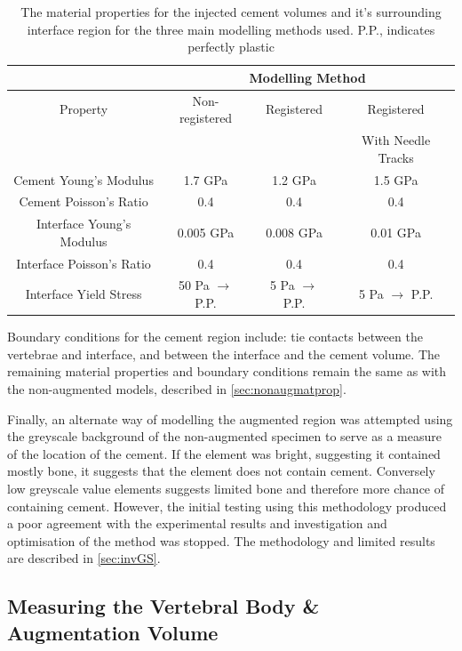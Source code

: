 \begin{table}[h]
\centering
\caption{The material properties for the injected cement volumes and it's
	surrounding interface region for the three main modelling methods
used. P.P., indicates perfectly plastic}
\label{tab:matprops4cmt}
\begin{tabular}{c|c|c|c}
               & \multicolumn{3}{c}{Modelling Method}				\\
	\hline 
	Property	       & Non-registered & Registered & Registered  \\ 
			       &		&	     & With Needle
	Tracks \\ \hline \hline
Cement Young's Modulus    &1.7 GPa            & 1.2 GPa       & 1.5 GPa \\
Cement Poisson's Ratio    &0.4                & 0.4           &0.4  \\ \hline
Interface Young's Modulus & 0.005 GPa          & 0.008 GPa      &0.01 GPa \\ 
Interface Poisson's Ratio & 0.4               & 0.4           & 0.4\\ 
Interface Yield Stress	  & 50 Pa $\rightarrow$ P.P.      & 5 Pa $\rightarrow$
P.P.  & 5 Pa $\rightarrow$ P.P.
\\ \hline
\end{tabular}
\end{table}

Boundary conditions for the cement region include: tie contacts between the
vertebrae and interface, and between the interface and the cement volume.
The remaining material properties and boundary conditions remain the same as
with the non-augmented models, described in \cref{sec:nonaugmatprop}.

Finally, an alternate way of modelling the augmented region was attempted using
the greyscale background of the non-augmented specimen to serve as a measure of
the location of the cement. If the element was bright, suggesting it contained
mostly bone, it suggests that the element does not contain cement. Conversely
low greyscale value elements suggests limited bone and therefore more chance of
containing cement. However, the initial testing using this methodology produced
a poor agreement with the experimental results and investigation and
optimisation of the method was stopped. The methodology and limited results are
described in \cref{sec:invGS}.

\subsection{Measuring the Vertebral Body \& Augmentation Volume}

